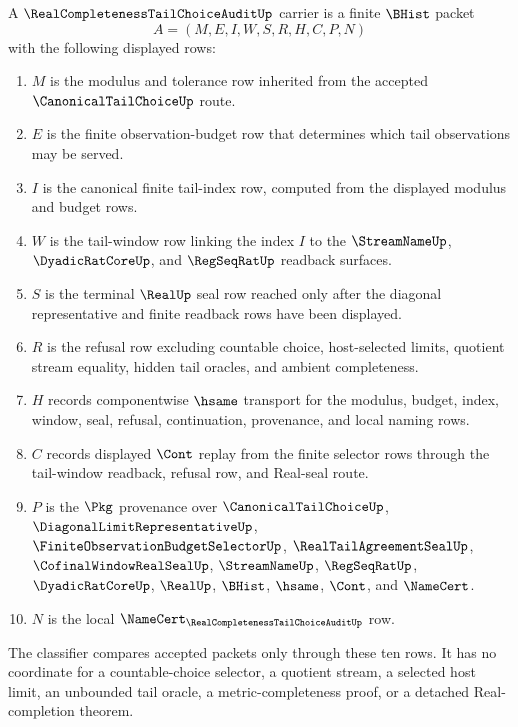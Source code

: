 \begin{definition}
\label{def:real-completeness-tail-choice-audit-carrier}
A $\RealCompletenessTailChoiceAuditUp$ carrier is a finite $\BHist$ packet
$$
A=(M,E,I,W,S,R,H,C,P,N)
$$
with the following displayed rows:
\begin{enumerate}
\item $M$ is the modulus and tolerance row inherited from the accepted $\CanonicalTailChoiceUp$ route.
\item $E$ is the finite observation-budget row that determines which tail observations may be served.
\item $I$ is the canonical finite tail-index row, computed from the displayed modulus and budget rows.
\item $W$ is the tail-window row linking the index $I$ to the $\StreamNameUp$, $\DyadicRatCoreUp$, and $\RegSeqRatUp$ readback surfaces.
\item $S$ is the terminal $\RealUp$ seal row reached only after the diagonal representative and finite readback rows have been displayed.
\item $R$ is the refusal row excluding countable choice, host-selected limits, quotient stream equality, hidden tail oracles, and ambient completeness.
\item $H$ records componentwise $\hsame$ transport for the modulus, budget, index, window, seal, refusal, continuation, provenance, and local naming rows.
\item $C$ records displayed $\Cont$ replay from the finite selector rows through the tail-window readback, refusal row, and Real-seal route.
\item $P$ is the $\Pkg$ provenance over $\CanonicalTailChoiceUp$, $\DiagonalLimitRepresentativeUp$, $\FiniteObservationBudgetSelectorUp$, $\RealTailAgreementSealUp$, $\CofinalWindowRealSealUp$, $\StreamNameUp$, $\RegSeqRatUp$, $\DyadicRatCoreUp$, $\RealUp$, $\BHist$, $\hsame$, $\Cont$, and $\NameCert$.
\item $N$ is the local $\NameCert_{\RealCompletenessTailChoiceAuditUp}$ row.
\end{enumerate}
The classifier compares accepted packets only through these ten rows. It has no coordinate for a countable-choice selector, a quotient stream, a selected host limit, an unbounded tail oracle, a metric-completeness proof, or a detached Real-completion theorem.
\end{definition}

